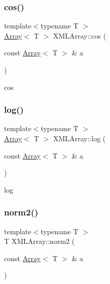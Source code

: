 \subsubsection{\texorpdfstring{cos()}{cos()}}
{\footnotesize\ttfamily template$<$typename T $>$ \\
\mbox{\hyperlink{classXMLArray_1_1Array}{Array}}$<$ T $>$ X\+M\+L\+Array\+::cos (\begin{DoxyParamCaption}\item[{const \mbox{\hyperlink{classXMLArray_1_1Array}{Array}}$<$ T $>$ \&}]{a }\end{DoxyParamCaption})\hspace{0.3cm}{\ttfamily [inline]}}



cos 

\mbox{\label{namespaceXMLArray_adea4803e894b23debf6555f41722fc8a}} 
\subsubsection{\texorpdfstring{log()}{log()}}
{\footnotesize\ttfamily template$<$typename T $>$ \\
\mbox{\hyperlink{classXMLArray_1_1Array}{Array}}$<$ T $>$ X\+M\+L\+Array\+::log (\begin{DoxyParamCaption}\item[{const \mbox{\hyperlink{classXMLArray_1_1Array}{Array}}$<$ T $>$ \&}]{a }\end{DoxyParamCaption})\hspace{0.3cm}{\ttfamily [inline]}}



log 

\mbox{\label{namespaceXMLArray_a86ac84a2d19bf404766498fc122af036}} 
\subsubsection{\texorpdfstring{norm2()}{norm2()}}
{\footnotesize\ttfamily template$<$typename T $>$ \\
T X\+M\+L\+Array\+::norm2 (\begin{DoxyParamCaption}\item[{const \mbox{\hyperlink{classXMLArray_1_1Array}{Array}}$<$ T $>$ \&}]{a }\end{DoxyParamCaption})\hspace{0.3cm}{\ttfamily [inline]}}



